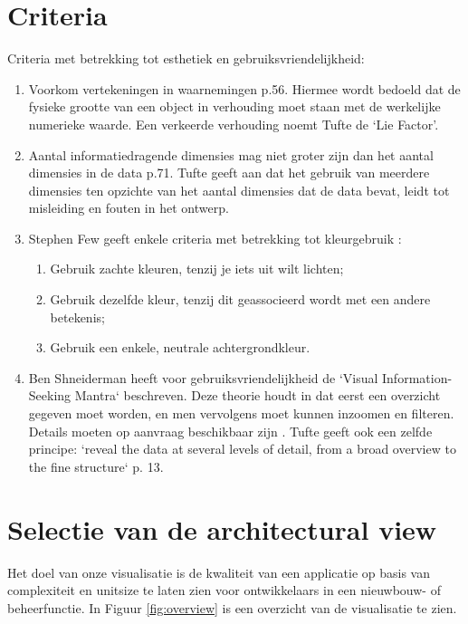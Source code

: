 \documentclass[a4paper]{article}
\begin{document}
\section{Criteria}
Criteria met betrekking tot esthetiek en gebruiksvriendelijkheid:
\begin{enumerate}
\item Voorkom vertekeningen in waarnemingen \cite{tufte2014visual} p.56. Hiermee wordt bedoeld dat de fysieke grootte van een object in verhouding moet staan met de werkelijke numerieke waarde. Een verkeerde verhouding noemt Tufte de `Lie Factor'.
\item Aantal informatiedragende dimensies mag niet groter zijn dan het aantal dimensies in de data \cite{tufte2014visual} p.71. Tufte geeft aan dat het gebruik van meerdere dimensies ten opzichte van het aantal dimensies dat de data bevat, leidt tot misleiding en fouten in het ontwerp.

\item Stephen Few geeft enkele criteria met betrekking tot kleurgebruik \cite{B}:
\begin{enumerate}
\item Gebruik zachte kleuren, tenzij je iets uit wilt lichten;
\item Gebruik dezelfde kleur, tenzij dit geassocieerd wordt met een andere betekenis; 
\item Gebruik een enkele, neutrale achtergrondkleur.
\end{enumerate}

\item Ben Shneiderman heeft voor gebruiksvriendelijkheid de `Visual Information-Seeking Mantra` beschreven. Deze theorie houdt in dat eerst een overzicht gegeven moet worden, en men vervolgens moet kunnen inzoomen en filteren. Details moeten op aanvraag beschikbaar zijn \cite{A}. Tufte geeft ook een zelfde principe: `reveal the data at several levels of detail, from a broad overview to the fine structure` \cite{tufte2014visual} p. 13.
\end{enumerate}


\section{Selectie van de architectural view}
Het doel van onze visualisatie is de kwaliteit van een applicatie op basis van complexiteit en unitsize te laten zien voor ontwikkelaars in een nieuwbouw- of beheerfunctie. In Figuur \ref{fig:overview} is een overzicht van de visualisatie te zien.
\end{document}
